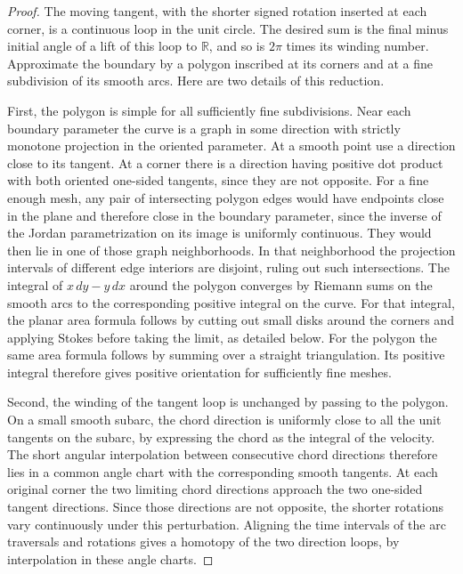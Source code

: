 \documentclass[11pt,oneside,openany]{book}
\theoremstyle{plain}
\theoremstyle{definition}
\theoremstyle{remark}
\begin{document}
\begin{proof}
The moving tangent, with the shorter signed rotation
inserted at each corner, is a continuous loop in the unit
circle. The desired sum is the final minus initial angle
of a lift of this loop to \(\mathbb R\), and so is \(2\pi\)
times its winding number. Approximate the boundary by a
polygon inscribed at its corners and at a fine subdivision
of its smooth arcs. Here are two details of this reduction.

First, the polygon is simple for all sufficiently fine
subdivisions. Near each boundary parameter the curve is
a graph in some direction with strictly monotone projection
in the oriented parameter. At a smooth point use a direction
close to its tangent. At a corner there is a direction
having positive dot product with both oriented one-sided
tangents, since they are not opposite. For a fine enough
mesh, any pair of intersecting polygon edges would have
endpoints close in the plane and therefore close in the
boundary parameter, since the inverse of the Jordan
parametrization on its image is uniformly continuous.
They would then lie in one of those graph neighborhoods.
In that neighborhood the projection intervals of different
edge interiors are disjoint, ruling out such intersections.
The integral of \(x\,dy-y\,dx\) around the polygon converges
by Riemann sums on the smooth arcs to the corresponding
positive integral on the curve. For that integral, the planar
area formula follows by cutting out small disks around the
corners and applying Stokes before taking the limit, as
detailed below. For the polygon the same area formula follows
by summing over a straight triangulation. Its positive integral
therefore gives positive orientation for sufficiently fine meshes.

Second, the winding of the tangent loop is unchanged by
passing to the polygon. On a small smooth subarc, the chord
direction is uniformly close to all the unit tangents on
the subarc, by expressing the chord as the integral of the
velocity. The short angular interpolation between consecutive
chord directions therefore lies in a common angle chart
with the corresponding smooth tangents. At each original
corner the two limiting chord directions approach the two
one-sided tangent directions. Since those directions are
not opposite, the shorter rotations vary continuously
under this perturbation. Aligning the time intervals of
the arc traversals and rotations gives a homotopy of the
two direction loops, by interpolation in these angle
charts.


\end{proof}
\end{document}
